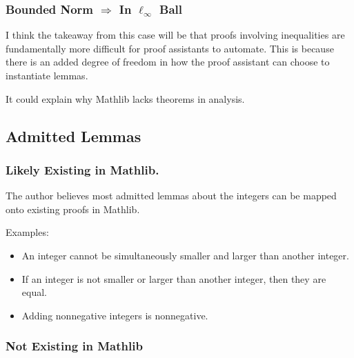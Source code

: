 \documentclass{article}
\begin{document}


\subsubsection{Bounded Norm $\Rightarrow$ In $\ell_\infty$ Ball}
I think the takeaway from this case will be that proofs involving inequalities are fundamentally more difficult for proof assistants to automate.
This is because there is an added degree of freedom in how the proof assistant can choose to instantiate lemmas.

It could explain why Mathlib lacks theorems in analysis.

\subsection{Admitted Lemmas}
\subsubsection{Likely Existing in Mathlib.}
The author believes most admitted lemmas about the integers can be mapped onto existing proofs in Mathlib.

Examples:
\begin{itemize}
  \item An integer cannot be simultaneously smaller and larger than another integer.
  \item If an integer is not smaller or larger than another integer, then they are equal.
  \item Adding nonnegative integers is nonnegative.
\end{itemize}

\subsubsection{Not Existing in Mathlib}
\end{document}
